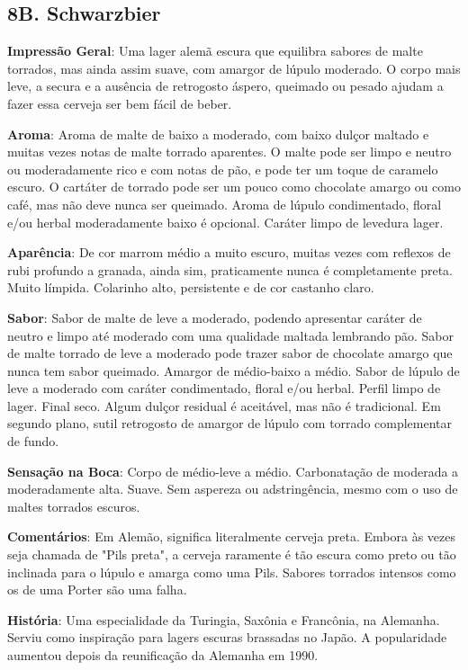 \subsection*{8B. Schwarzbier}
\textbf{Impressão Geral}: Uma lager alemã escura que equilibra sabores de malte torrados, mas ainda assim suave, com amargor de lúpulo moderado. O corpo mais leve, a secura e a ausência de retrogosto áspero, queimado ou pesado ajudam a fazer essa cerveja ser bem fácil de beber.

\textbf{Aroma}: Aroma de malte de baixo a moderado, com baixo dulçor maltado e muitas vezes notas de malte torrado aparentes. O malte pode ser limpo e neutro ou moderadamente rico e com notas de pão, e pode ter um toque de caramelo escuro. O cartáter de torrado pode ser um pouco como chocolate amargo ou como café, mas não deve nunca ser queimado. Aroma de lúpulo condimentado, floral e/ou herbal moderadamente baixo é opcional. Caráter limpo de levedura lager.

\textbf{Aparência}: De cor marrom médio a muito escuro, muitas vezes com reflexos de rubi profundo a granada, ainda sim, praticamente nunca é completamente preta. Muito límpida. Colarinho alto, persistente e de cor castanho claro.

\textbf{Sabor}: Sabor de malte de leve a moderado, podendo apresentar caráter de neutro e limpo até moderado com uma qualidade maltada lembrando pão. Sabor de malte torrado de leve a moderado pode trazer sabor de chocolate amargo que nunca tem sabor queimado. Amargor de médio-baixo a médio. Sabor de lúpulo de leve a moderado com caráter condimentado, floral e/ou herbal. Perfil limpo de lager. Final seco. Algum dulçor residual é aceitável, mas não é tradicional. Em segundo plano, sutil retrogosto de amargor de lúpulo com torrado complementar de fundo.

\textbf{Sensação na Boca}: Corpo de médio-leve a médio. Carbonatação de moderada a moderadamente alta. Suave. Sem aspereza ou adstringência, mesmo com o uso de maltes torrados escuros.

\textbf{Comentários}: Em Alemão, significa literalmente cerveja preta. Embora às vezes seja chamada de "Pils preta", a cerveja raramente é tão escura como preto ou tão inclinada para o lúpulo e amarga como uma Pils. Sabores torrados intensos como os de uma Porter são uma falha.

\textbf{História}: Uma especialidade da Turingia, Saxônia e Francônia, na Alemanha. Serviu como inspiração para lagers escuras brassadas no Japão. A popularidade aumentou depois da reunificação da Alemanha em 1990.


